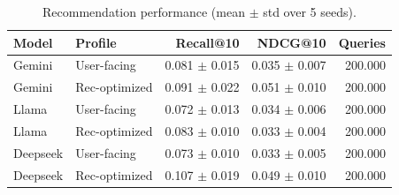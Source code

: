 \begin{table}[t]
\centering
\begin{table}
\caption{Recommendation performance (mean $\pm$ std over 5 seeds).}
\label{tab:rec_perf_mean_std}
\begin{tabular}{llrrr}
\toprule
Model & Profile & Recall@10 & NDCG@10 & Queries \\
\midrule
Gemini & User-facing & 0.081 $\pm$ 0.015 & 0.035 $\pm$ 0.007 & 200.000 \\
Gemini & Rec-optimized & 0.091 $\pm$ 0.022 & 0.051 $\pm$ 0.010 & 200.000 \\
Llama & User-facing & 0.072 $\pm$ 0.013 & 0.034 $\pm$ 0.006 & 200.000 \\
Llama & Rec-optimized & 0.083 $\pm$ 0.010 & 0.033 $\pm$ 0.004 & 200.000 \\
Deepseek & User-facing & 0.073 $\pm$ 0.010 & 0.033 $\pm$ 0.005 & 200.000 \\
Deepseek & Rec-optimized & 0.107 $\pm$ 0.019 & 0.049 $\pm$ 0.010 & 200.000 \\
\bottomrule
\end{tabular}
\end{table}
\end{table}
